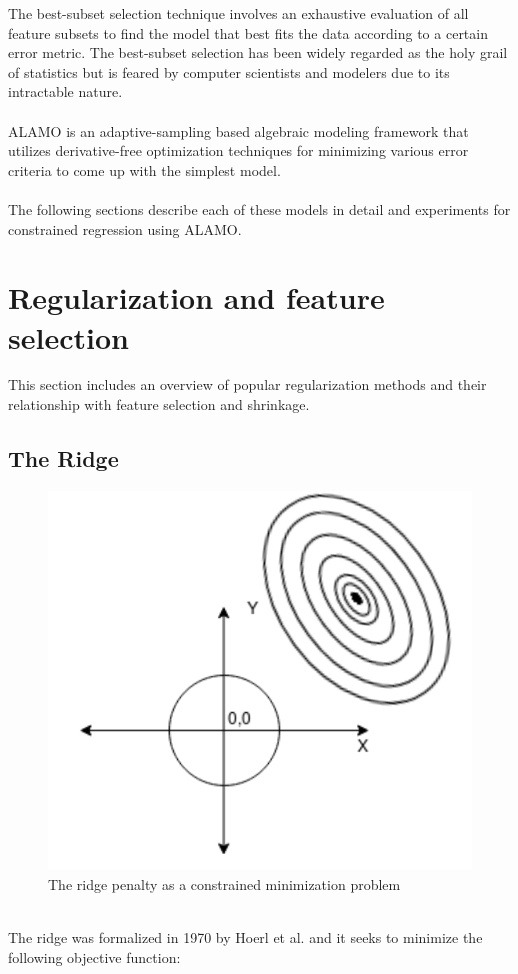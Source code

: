 \documentclass[a4paper,12pt]{article}
\begin{document}
The best-subset selection\cite{narendra1977branch,john1994irrelevant,kohavi1997wrappers} technique involves an exhaustive evaluation of all feature subsets to find the model that best fits the data according to a certain error metric. The best-subset selection has been widely regarded as the holy grail of statistics but is feared by computer scientists and modelers due to its intractable nature.\\\\
ALAMO\cite{cozad2014learning,cozad2015combined,wilson2017alamo} is an adaptive-sampling based algebraic modeling framework that utilizes derivative-free optimization techniques for minimizing various error criteria to come up with the simplest model.\\\\
The following sections describe each of these models in detail and experiments for constrained regression using ALAMO.


\newpage
\section{Regularization and feature selection}
This section includes an overview of popular regularization methods and their relationship with feature selection and shrinkage.
\subsection{The Ridge}
\begin{figure}[H]
    \centering
    \includegraphics[scale=0.4]{ridge.png}
    \caption{The ridge penalty as a constrained minimization problem}
    \label{fig:ALAMO Flowchart}
\end{figure}
\\
The ridge was formalized in 1970 by Hoerl et al.\cite{hoerl1970ridge} and it seeks to minimize the following objective function:
\end{document}
